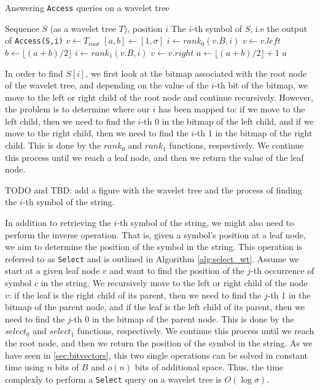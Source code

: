\begin{algorithm}[h!]
    \caption{Answering \texttt{Access} queries on a wavelet tree}\label{alg:access_wt}
    \begin{algorithmic}
        \Require Sequence $S$ (as a wavelet tree $T$), position $i$
        \Ensure The $i$-th symbol of $S$, i.e the output of \texttt{Access(S,i)}
        \State $v \gets T_{root}$ 
        \State $[a,b] \gets [1,\sigma]$
         
        \State $i \gets rank_0(v.B,i)$
        \State $v \gets v.left$ 
        \State $b \gets \lfloor (a+b)/2 \rfloor$
        \Else
        \State $i \gets rank_1(v.B,i)$
        \State $v \gets v.right$ 
        \State $a \gets \lfloor (a+b)/2 \rfloor +1$
        \EndIf
        \EndWhile
        \State \Return $a$
    \end{algorithmic}
\end{algorithm}

\noindent In order to find $S[i]$, we first look at the bitmap associated with the root node of the wavelet tree, and depending on the value of the $i$-th bit of the bitmap, we move to the left or right child of the root node and continue recursively. However, the problem is to determine where our $i$ has been mapped to: if we move to the left child, then we need to find the $i$-th 0 in the bitmap of the left child, and if we move to the right child, then we need to find the $i$-th 1 in the bitmap of the right child. This is done by the $rank_0$ and $rank_1$ functions, respectively. We continue this process until we reach a leaf node, and then we return the value of the leaf node.

\begin{example}
    TODO and TBD: add a figure with the wavelet tree and the process of finding the $i$-th symbol of the string.
\end{example}

\noindent In addition to retrieving the $i$-th symbol of the string, we might also need to perform the inverse operation. That is, given a symbol's position at a leaf node, we aim to determine the position of the symbol in the string. This operation is referred to as \texttt{Select} and is outlined in Algorithm \ref{alg:select_wt}. Assume we start at a given leaf node $v$ and want to find the position of the $j$-th occurrence of symbol $c$ in the string. We recursively move to the left or right child of the node $v$: if the leaf is the right child of its parent, then we need to find the $j$-th 1 in the bitmap of the parent node, and if the leaf is the left child of its parent, then we need to find the $j$-th 0 in the bitmap of the parent node. This is done by the $select_0$ and $select_1$ functions, respectively. We continue this process until we reach the root node, and then we return the position of the symbol in the string. As we have seen in \autoref{sec:bitvectors}, this two single operations can be solved in constant time using $n$ bits of $B$ and $o(n)$ bits of additional space. Thus, the time complexly to perform a \texttt{Select} query on a wavelet tree is $O(\log \sigma)$.

